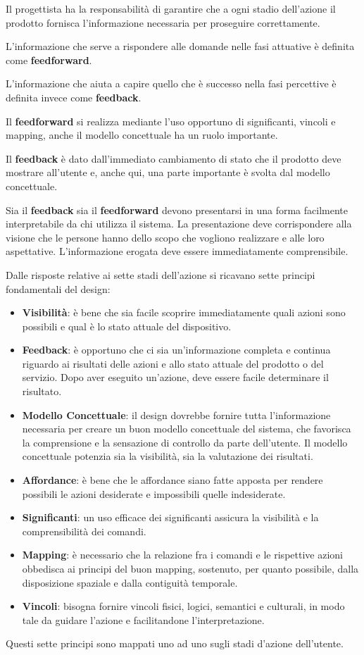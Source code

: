 Il progettista ha la responsabilità di garantire che a ogni stadio dell'azione il prodotto fornisca l'informazione necessaria per proseguire correttamente.

L'informazione che serve a rispondere alle domande nelle fasi attuative è definita come \textbf{feedforward}.

L'informazione che aiuta a capire quello che è successo nella fasi percettive è definita invece come \textbf{feedback}.

Il \textbf{feedforward} si realizza mediante l'uso opportuno di significanti, vincoli e mapping, anche il modello concettuale ha un ruolo importante.

Il \textbf{feedback} è dato dall'immediato cambiamento di stato che il prodotto deve mostrare all'utente e, anche qui, una parte importante è svolta
dal modello concettuale.

Sia il \textbf{feedback} sia il \textbf{feedforward} devono presentarsi in una forma facilmente interpretabile da chi utilizza il sistema. La
presentazione deve corrispondere alla visione che le persone hanno dello scopo che vogliono realizzare e alle loro aspettative. L'informazione
erogata deve essere immediatamente comprensibile.

Dalle risposte relative ai sette stadi dell'azione si ricavano sette principi fondamentali del design:

\begin{itemize}
	\itemsep-0.3em
	\item \textbf{Visibilità}: è bene che sia facile scoprire immediatamente quali azioni sono possibili e qual è lo stato attuale del dispositivo.
	\item \textbf{Feedback}: è opportuno che ci sia un'informazione completa e continua riguardo ai risultati delle azioni e allo stato attuale del
	prodotto o del servizio. Dopo aver eseguito un'azione, deve essere facile determinare il risultato.
	\item \textbf{Modello Concettuale}: il design dovrebbe fornire tutta l'informazione necessaria per creare un buon modello concettuale del sistema,
	che favorisca la comprensione e la sensazione di controllo da parte dell'utente. Il modello concettuale potenzia sia la visibilità, sia la valutazione
	dei risultati.
	\item \textbf{Affordance}: è bene che le affordance siano fatte apposta per rendere possibili le azioni desiderate e impossibili quelle indesiderate.
	\item \textbf{Significanti}: un uso efficace dei significanti assicura la visibilità e la comprensibilità dei comandi.
	\item \textbf{Mapping}: è necessario che la relazione fra i comandi e le rispettive azioni obbedisca ai principi del buon mapping, sostenuto,
	per quanto possibile, dalla disposizione spaziale e dalla contiguità temporale.
	\item \textbf{Vincoli}: bisogna fornire vincoli fisici, logici, semantici e culturali, in modo tale da guidare l'azione e facilitandone
	l'interpretazione.
\end{itemize}
Questi sette principi sono mappati uno ad uno sugli stadi d'azione dell'utente.

